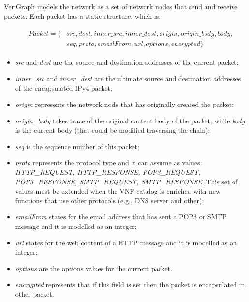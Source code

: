 VeriGraph models the network as a set of network nodes that send and receive packets. Each packet has a static structure, which is:
\begin{figure}[h]
	{\footnotesize
		\begin{subequations}
			\begin{align}
				\begin{split}
				\label{fields}
					Packet = \{& src, dest,inner\_src,inner\_dest, origin, origin\_body, body,\\
					&   seq, proto, emailFrom, url, options, encrypted\}
				\end{split}
			\end{align}
		\end{subequations}}
	\end{figure}
\begin{itemize}
	\item \textit{src} and \textit{dest} are the source and destination addresses of the current packet;
		\item \textit{inner\_src} and \textit{inner\_dest} are the ultimate source and destination addresses of the encapsulated IPv4 packet;
	\item \textit{origin} represents the network node that has originally created the packet;
	\item \textit{origin\_body} takes trace of the original content body of the packet, while \textit{body} is the current body (that could be modified traversing the chain);
	\item \textit{seq} is the sequence number of this packet;
	\item \textit{proto} represents the protocol type and it can assume as values: \textit{HTTP\_REQUEST, HTTP\_RESPONSE, POP3\_REQUEST, POP3\_RESPONSE, SMTP\_REQUEST, SMTP\_RESPONSE}. This set of values must be extended when the VNF catalog is enriched with new functions that use other protocols (e.g., DNS server and other);
	\item \textit{emailFrom} states for the email address that has sent a POP3 or SMTP message and it is modelled as an integer;
	\item\textit{url} states for the web content of a HTTP message and it is modelled as an integer;
	\item \textit{options} are the options values for the current packet.
		\item \textit{encrypted} represents that if this field is set then the packet is encapsulated in other packet.
\end{itemize}
